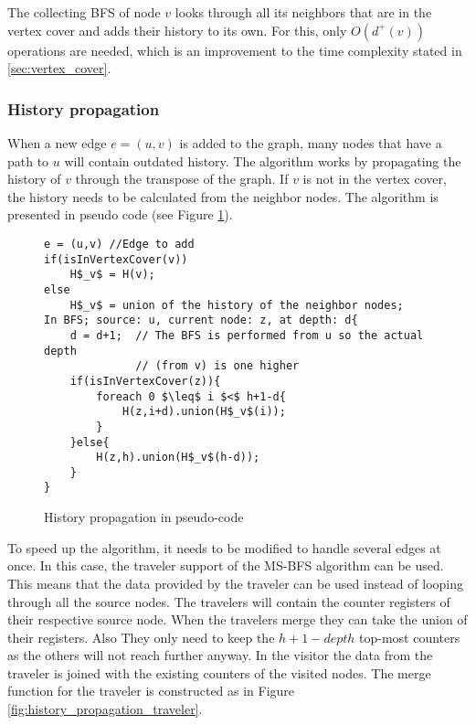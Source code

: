 The collecting BFS of node $v$ looks through all its neighbors that are in the vertex cover and adds their history to its own. For this, only $O(d^+(v))$ operations are needed, which is an improvement to the time complexity stated in \ref{sec:vertex_cover}. \\


\subsubsection{History propagation}

When a new edge $e = (u,v)$ is added to the graph, many nodes that have a path to $u$ will contain outdated history. The algorithm works by propagating the history of $v$ through the transpose of the graph. If $v$ is not in the vertex cover, the history needs to be calculated from the neighbor nodes. The algorithm is presented in pseudo code (see Figure \ref{fig:history_propagation_algorithm}).

\begin{figure}[h]
    \begin{lstlisting}[mathescape]
e = (u,v) //Edge to add
if(isInVertexCover(v))
    H$_v$ = H(v);
else
    H$_v$ = union of the history of the neighbor nodes;
In BFS; source: u, current node: z, at depth: d{
    d = d+1;  // The BFS is performed from u so the actual depth 
              // (from v) is one higher
    if(isInVertexCover(z)){
        foreach 0 $\leq$ i $<$ h+1-d{
            H(z,i+d).union(H$_v$(i));
        }
    }else{
        H(z,h).union(H$_v$(h-d));
    }
}
    \end{lstlisting}
    \caption{History propagation in pseudo-code}
    \label{fig:history_propagation_algorithm}
\end{figure}

To speed up the algorithm, it needs to be modified to handle several edges at once. In this case, the traveler support of the MS-BFS algorithm can be used. This means that the data provided by the traveler can be used instead of looping through all the source nodes. The travelers will contain the counter registers of their respective source node. When the travelers merge they can take the union of their registers. Also They only need to keep the $h+1-depth$ top-most counters as the others will not reach further anyway. In the visitor the data from the traveler is joined with the existing counters of the visited nodes. The merge function for the traveler is constructed as in Figure \ref{fig:history_propagation_traveler}.

